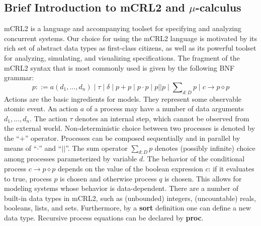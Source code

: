 \documentclass[letter]{llncs}
\begin{document}
\subsection{Brief Introduction to mCRL2 and $\mu$-calculus}
mCRL2 is a language and accompanying toolset for specifying and analyzing concurrent systems. 
Our choice for using the mCRL2 language is motivated by its rich set of 
abstract data types as first-class citizens, as well as its powerful toolset for analyzing, simulating, and visualizing specifications. 
The fragment of the mCRL2 syntax that is most commonly used is given by the following BNF grammar:
\vspace{-7 pt}
\[p ::= a(d_1,\dots,d_n) \mid \tau \mid \delta \mid p+p \mid p\cdot p \mid p||p \mid \sum\nolimits_{d:D}p \mid c\rightarrow p\diamond p
\]
Actions are the basic ingredients for models. They represent some observable
atomic event. An action $a$ of a process may have a number of data arguments  \begin{math}d_1,...,d_n\end{math}.
The action ${\tau}$ denotes an internal step, which cannot be observed from the external world. 
Non-deterministic choice between two processes
is denoted by the ``$+$'' operator. Processes can be composed sequentially and in parallel by means of ``$\cdot$'' and
``${||}$''. The sum
operator $\sum_{d:D}p$ denotes (possibly infinite) choice among
processes parameterized by variable $d$. The behavior of the conditional process $c\rightarrow p\diamond p$ 
depends on the value of the boolean expression $c$: if it evaluates to true, process $p$
is chosen and otherwise process $q$ is chosen.
This allows for modeling systems whose behavior is data-dependent.
There are a number of built-in data types in mCRL2, such as (unbounded) integers, (uncountable)
reals, booleans, lists, and sets. 
Furthermore, by a \textbf{sort} definition one can define a new data type. Recursive process 
equations can be declared by \textbf{proc}.
\end{document}
